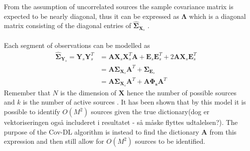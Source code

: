 From the assumption of uncorrelated sources the sample covariance matrix is expected to be nearly diagonal, thus it can be expressed as $\boldsymbol{\Lambda}$ which is a diagonal matrix consisting of the diagonal entries of $\hat{\boldsymbol{\Sigma}}_{\mathbf{X}_s}$ \cite{Balkan2015}.
\\ \\
Each segment of observations can be modelled as
\begin{align}\label{eq:cov_model}
\hat{\boldsymbol{\Sigma}}_{\mathbf{Y}_s} = \mathbf{Y}_s \mathbf{Y}_s^T &= \mathbf{A} \mathbf{X}_s \mathbf{X}_s^T \mathbf{A} + \mathbf{E}_s \mathbf{E}_s^T + 2 \mathbf{A} \mathbf{X}_s \mathbf{E}_s^T \nonumber \\
&= \mathbf{A} \boldsymbol{\Sigma}_{\mathbf{X}_s} \mathbf{A}^T + \boldsymbol{\Sigma}_{\mathbf{E}_s} \nonumber \\
&= \mathbf{A} \boldsymbol{\Sigma}_{\mathbf{X}_s} \mathbf{A}^T + \mathbf{A} \boldsymbol{\Phi_s} \mathbf{A}^T 
\end{align}
Remember that $N$ is the dimension of $\mathbf{X}$ hence the number of possible sources and $k$ is the number of active sources .
It has been shown that by this model it is possible to identify $O(M^2)$ sources given the true dictionary\cite{Pal2015}(dog er vektoriseringen også includeret i resultatet - så måske flyttes udtalelsen?). The purpose of the Cov-DL algorithm is instead to find the dictionary $\textbf{A}$ from this expression and then still allow for $O(M^2)$ sources to be identified.

